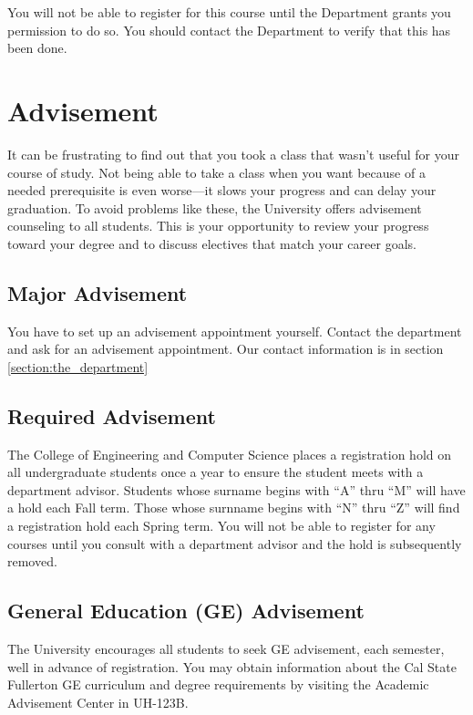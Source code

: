 \documentclass{book}
\begin{document}
You will not be able to register for this course until the Department grants you permission to do so. You should contact the Department to verify that this has been done.

\chapter{Advisement}

It can be frustrating to find out that you took a class that wasn’t useful for your course of study. Not being able to take a class when you want because of a needed prerequisite is even worse---it slows your progress and can delay your graduation. To avoid problems like these, the University offers advisement counseling to all students. This is your opportunity to review your progress toward your degree and to discuss electives that match your career goals.

\section{Major Advisement}
You have to set up an advisement appointment yourself. Contact the department and ask for an advisement appointment. Our contact information is in section \ref{section:the_department}

\section{Required Advisement}
The College of Engineering and Computer Science places a registration hold on all undergraduate students once a year to ensure the student meets with a department advisor. Students whose surname begins with ``A'' thru ``M'' will have a hold each Fall term. Those whose surnname begins with ``N'' thru ``Z'' will find a registration hold each Spring term.  You will not be able to register for any courses until you consult with a department advisor and the hold is subsequently removed.

\section{General Education (GE) Advisement}
 
The University encourages all students to seek GE advisement, each semester, well in advance of registration.  You may obtain information about the Cal State Fullerton GE curriculum and degree requirements by visiting the Academic Advisement Center in UH-123B.
\end{document}
